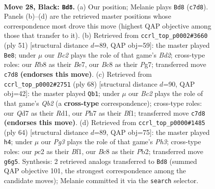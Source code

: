 \documentclass[11pt]{article}
\begin{document}
\clearpage

\begin{figure}[p]\centering
\begin{subfigure}{0.46\textwidth}\centering
\resizebox{\linewidth}{!}{%
\newchessgame
\chessboard[
  setfen={1rb4k/ppbq3p/5ppB/3B4/5P1P/2QP1N2/PPP2PK1/4R3 b - - 0 28},
  showmover=false,
  pgfstyle=straightmove, color=movearrow, markmove={c7-d8}
]}
\caption{}
\end{subfigure}\hfill
\begin{subfigure}{0.46\textwidth}\centering
\resizebox{\linewidth}{!}{%
\newchessgame
\chessboard[
  setfen={6k1/3bb1p1/r1q2p1p/Bp2p3/1P2N3/2PQ4/1P3PPP/3R2K1 b - - 3 26},
  showmover=false,
  pgfstyle=straightmove, color=movearrow, markmove={d7-e8}
]}
\caption{}
\end{subfigure}
\\[4pt]
\begin{subfigure}{0.46\textwidth}\centering
\resizebox{\linewidth}{!}{%
\newchessgame
\chessboard[
  setfen={r7/2p2kp1/1pbpnq1p/8/1PP5/5PB1/1Q4PP/3R1BK1 w - - 15 35},
  showmover=false,
  pgfstyle=straightmove, color=movearrow, markmove={b2-b1}
]}
\caption{}
\end{subfigure}\hfill
\begin{subfigure}{0.46\textwidth}\centering
\resizebox{\linewidth}{!}{%
\newchessgame
\chessboard[
  setfen={5r2/p5bk/1qp1b1pp/3np3/8/1NP3BP/PP2QP2/4RBK1 w - - 5 33},
  showmover=false,
  pgfstyle=straightmove, color=movearrow, markmove={h3-h4}
]}
\caption{}
\end{subfigure}
\caption{\textbf{Move 28, Black: \texttt{Bd8}.} (a) Our position; Melanie plays \texttt{Bd8} (\texttt{c7d8}). Panels (b)--(d) are the retrieved master positions whose correspondence most drove this move (highest QAP objective among those that transfer to it). (b) Retrieved from \texttt{ccrl\_top\_p0002\#3660} (ply 51) [structural distance $d$=89, QAP obj=59]: the master played \texttt{Be8}; under $\mu$ our \emph{Bc2} plays the role of that game's \emph{Bd2}; cross-type roles: our \emph{R}b8 as their \emph{B}e7, our \emph{B}c8 as their \emph{P}g7; transferred move \texttt{c7d8} \textbf{(endorses this move)}. (c) Retrieved from \texttt{ccrl\_top\_p0002\#2751} (ply 68) [structural distance $d$=90, QAP obj=42]: the master played \texttt{Qb1}; under $\mu$ our \emph{Bc2} plays the role of that game's \emph{Qb2} (a \textbf{cross-type} correspondence); cross-type roles: our \emph{Q}d7 as their \emph{R}d1, our \emph{P}h7 as their \emph{B}f1; transferred move \texttt{c7d8} \textbf{(endorses this move)}. (d) Retrieved from \texttt{ccrl\_top\_p0000\#1485} (ply 64) [structural distance $d$=89, QAP obj=75]: the master played \texttt{h4}; under $\mu$ our \emph{Pg3} plays the role of that game's \emph{Ph3}; cross-type roles: our \emph{p}c2 as their \emph{B}f1, our \emph{B}c8 as their \emph{P}b2; transferred move \texttt{g6g5}. Synthesis: 2 retrieved analogs transferred to \texttt{Bd8} (summed QAP objective 101, the strongest correspondence among the candidate moves); Melanie committed it via the \texttt{search} selector.}
\label{fig:thought-m55}
\end{figure}
\end{document}
